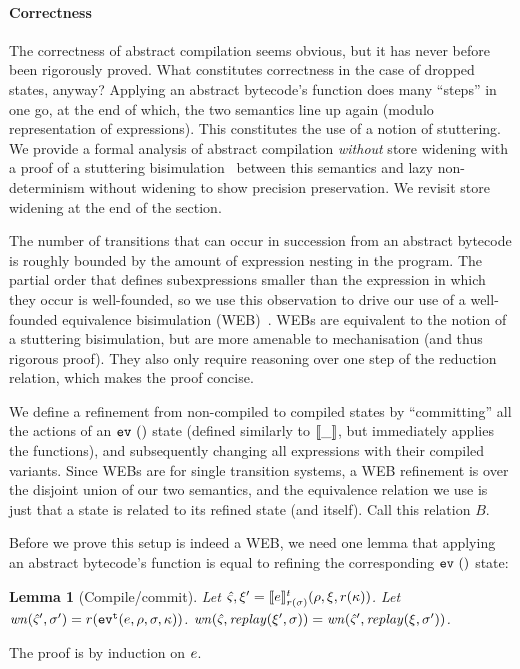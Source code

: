 \documentclass[preprint,onecolumn,9pt]{sigplanconf} %
\newtheorem{lemma}{Lemma}
\begin{document}
\paragraph{Correctness}
The correctness of abstract compilation seems obvious, but it has
never before been rigorously proved. What constitutes correctness in
the case of dropped states, anyway? Applying an abstract bytecode's
function does many ``steps'' in one go, at the end of which, the two
semantics line up again (modulo representation of expressions). This
constitutes the use of a notion of stuttering. We provide a formal
analysis of abstract compilation \emph{without} store widening with a proof
of a stuttering bisimulation~\cite{ianjohnson:BCG88} between this
semantics and lazy non-determinism without widening to show precision
preservation. We revisit store widening at the end of the section.

The number of transitions that can occur in succession from an
abstract bytecode is roughly bounded by the amount of expression
nesting in the program. The partial order that defines subexpressions
smaller than the expression in which they occur is well-founded, so we
use this observation to drive our use of a well-founded equivalence
bisimulation (WEB)~\cite{ianjohnson:manolios-diss}. WEBs are equivalent to the notion of a stuttering
bisimulation, but are more amenable to mechanisation (and thus
rigorous proof). They also only require reasoning over one step of the
reduction relation, which makes the proof concise.

We define a refinement from non-compiled to compiled states by
``committing'' all the actions of an $\ev{}$ state (defined similarly to
$\compile{\_}$, but immediately applies the functions), and
subsequently changing all expressions with their compiled
variants. Since WEBs are for single transition systems, a WEB
refinement is over the disjoint union of our two semantics, and the
equivalence relation we use is just that a state is related to its
refined state (and itself). Call this relation $B$.

Before we prove this setup is indeed a WEB, we need one lemma that
applying an abstract bytecode's function is equal to refining the
corresponding $\ev{}$ state:
%
\begin{lemma}[Compile/commit]
Let $\mastate,\msdiff' = \compile{\mexp}^\mcntr_{r(\msto)}(\menv,\msdiff,r(\mkont))$.
Let $\wn(\mastate',\msto') = r(\ev[^\mcntr]{\mexp,\menv,\msto,\mkont})$.
$\wn(\mastate,\replay(\msdiff',\msto)) = \wn(\mastate',\replay(\msdiff,\msto'))$.
\end{lemma}
The proof is by induction on $\mexp$.
\end{document}

